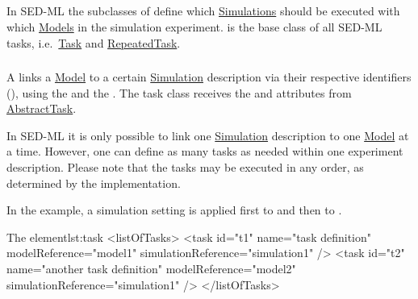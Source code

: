 \subsection{}
\label{class:abstractTask}
In SED-ML the subclasses of  define which \hyperref[class:simulation]{Simulations} should be executed with which \hyperref[class:model]{Models} in the simulation experiment.  is the base class of all SED-ML tasks, i.e.\ \hyperref[class:task]{Task} and \hyperref[class:repeatedTask]{RepeatedTask}.


\subsubsection{}
\label{class:task}

A  links a \hyperref[class:model]{Model} to a certain \hyperref[class:simulation]{Simulation} description via their respective identifiers (), using the \hyperref[sec:modelReference]{} and the \hyperref[sec:simulationReference]{}. The task class receives the \hyperref[sec:id]{} and \hyperref[sec:name]{} attributes from \hyperref[class:abstractTask]{AbstractTask}.

In SED-ML it is only possible to link one \hyperref[class:simulation]{Simulation} description to one \hyperref[class:model]{Model} at a time. However, one can define as many tasks as needed within one experiment description. Please note that the tasks may be executed in any order, as determined by the implementation.

In the example, a simulation setting  is applied first to  and then to .
\begin{myXmlLst}{The  element}{lst:task}
<listOfTasks>
	<task id="t1" name="task definition" modelReference="model1" 
		simulationReference="simulation1" />
	<task id="t2" name="another task definition" modelReference="model2" 
		simulationReference="simulation1" />
</listOfTasks>
\end{myXmlLst}

